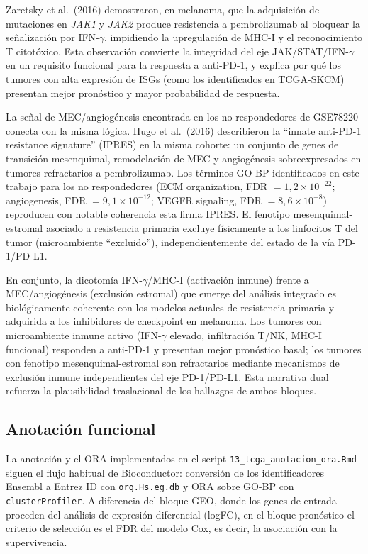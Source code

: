 Zaretsky et al.\ (2016) \cite{Zaretsky2016} demostraron, en melanoma, que la adquisición de mutaciones en \textit{JAK1} y \textit{JAK2} produce resistencia a pembrolizumab al bloquear la señalización por IFN-$\gamma$, impidiendo la upregulación de MHC-I y el reconocimiento T citotóxico. Esta observación convierte la integridad del eje JAK/STAT/IFN-$\gamma$ en un requisito funcional para la respuesta a anti-PD-1, y explica por qué los tumores con alta expresión de ISGs (como los identificados en TCGA-SKCM) presentan mejor pronóstico y mayor probabilidad de respuesta.

La señal de MEC/angiogénesis encontrada en los no respondedores de GSE78220 conecta con la misma lógica. Hugo et al.\ (2016) \cite{Hugo2016} describieron la ``innate anti-PD-1 resistance signature'' (IPRES) en la misma cohorte: un conjunto de genes de transición mesenquimal, remodelación de MEC y angiogénesis sobreexpresados en tumores refractarios a pembrolizumab. Los términos GO-BP identificados en este trabajo para los no respondedores (ECM organization, FDR $= 1{,}2\times10^{-22}$; angiogenesis, FDR $= 9{,}1\times10^{-12}$; VEGFR signaling, FDR $= 8{,}6\times10^{-8}$) reproducen con notable coherencia esta firma IPRES. El fenotipo mesenquimal-estromal asociado a resistencia primaria excluye físicamente a los linfocitos T del tumor (microambiente ``excluido''), independientemente del estado de la vía PD-1/PD-L1.

En conjunto, la dicotomía IFN-$\gamma$/MHC-I (activación inmune) frente a MEC/angiogénesis (exclusión estromal) que emerge del análisis integrado es biológicamente coherente con los modelos actuales de resistencia primaria y adquirida a los inhibidores de checkpoint en melanoma. Los tumores con microambiente inmune activo (IFN-$\gamma$ elevado, infiltración T/NK, MHC-I funcional) responden a anti-PD-1 y presentan mejor pronóstico basal; los tumores con fenotipo mesenquimal-estromal son refractarios mediante mecanismos de exclusión inmune independientes del eje PD-1/PD-L1. Esta narrativa dual refuerza la plausibilidad traslacional de los hallazgos de ambos bloques.

\subsection{Anotación funcional}

La anotación y el ORA implementados en el script \texttt{13\_tcga\_anotacion\_ora.Rmd} siguen el flujo habitual de Bioconductor: conversión de los identificadores Ensembl a Entrez ID con \texttt{org.Hs.eg.db} y ORA sobre GO-BP con \texttt{clusterProfiler}. A diferencia del bloque GEO, donde los genes de entrada proceden del análisis de expresión diferencial (logFC), en el bloque pronóstico el criterio de selección es el FDR del modelo Cox, es decir, la asociación con la supervivencia.

